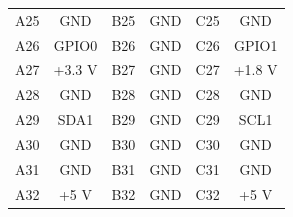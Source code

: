 \documentclass[a4paper]{article}
\begin{document}
\begin{table}[h]
\begin{center}
\begin{tabular}{cc|cc|cc}
            A25 & GND & B25 & GND & C25 & GND \\
            A26 & GPIO0 & B26 & GND & C26 & GPIO1 \\
            A27 & +3.3 V & B27 & GND & C27 & +1.8 V \\
            A28 & GND & B28 & GND & C28 & GND \\
            A29 & SDA1 & B29 & GND & C29 & SCL1 \\
            A30 & GND & B30 & GND & C30 & GND \\
            A31 & GND & B31 & GND & C31 & GND \\
            A32 & +5 V & B32 & GND & C32 & +5 V \\
            \hline
            \hline
        \end{tabular}
    \end{center}
\end{table}
\end{document}
